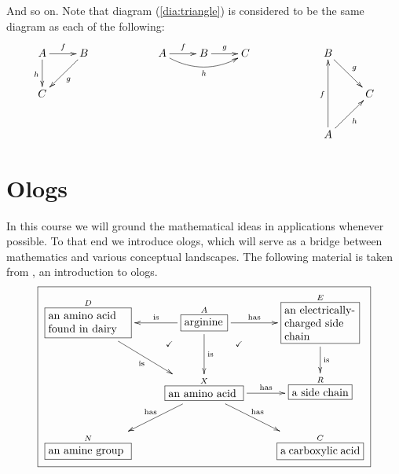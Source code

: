 \documentclass{book}
\def\tn{\textnormal}
\def\rr{\raggedright}
\newcommand{\LA}[2]{\ar[#1]^-{\tn {#2}}}
\newcommand{\LAL}[2]{\ar[#1]_-{\tn {#2}}}
\newcommand{\obox}[3]{\stackrel{#1}{\fbox{\parbox{#2}{#3}}}}
\newcommand{\mebox}[2]{\obox{#1}{1in}{#2}}
\newcommand{\smbox}[2]{\stackrel{#1}{\fbox{#2}}}
\newcommand{\fakebox}[1]{\tn{$\ulcorner$#1$\urcorner$}}
\theoremstyle{remark}
\theoremstyle{definition}
\begin{document}
And so on. Note that diagram (\ref{dia:triangle}) is considered to be the same diagram as each of the following:
$$
\xymatrix{A\ar[r]^f\ar[d]_h&B\ar[dl]^g\\C}\hspace{.8in}
\xymatrix{A\ar[r]^f\ar@/_1pc/[rr]_h&B\ar[r]^g&C}\hspace{.8in}
\xymatrix{B\ar[rd]^g\\&C\\A\ar[ru]_h\ar[uu]^f}$$




\section{Ologs}\label{sec:ologs}

In this course we will ground the mathematical ideas in applications whenever possible. To that end we introduce ologs, which will serve as a bridge between mathematics and various conceptual landscapes. The following material is taken from \cite{SK}, an introduction to ologs.
\begin{align}\label{dia:arginine}\fbox{\xymatrixnocompile{\obox{D}{1in}{\rr an amino acid found in dairy}\LAL{dr}{is}&\obox{A}{.5in}{arginine}\ar@{}[dl]|(.3){\checkmark}\ar@{}[dr]|(.3){\checkmark}\LA{r}{has}\LAL{l}{is}\LA{d}{is}&\obox{E}{.9in}{\rr an electrically-charged side chain}\LA{d}{is}\\&\obox{X}{.9in}{an amino acid}\LAL{dl}{has}\LA{dr}{has}\LA{r}{has}&\smbox{R}{a side chain}\\\mebox{N}{an amine group}&&\mebox{C}{a carboxylic acid}}}\end{align}  

\end{document}
